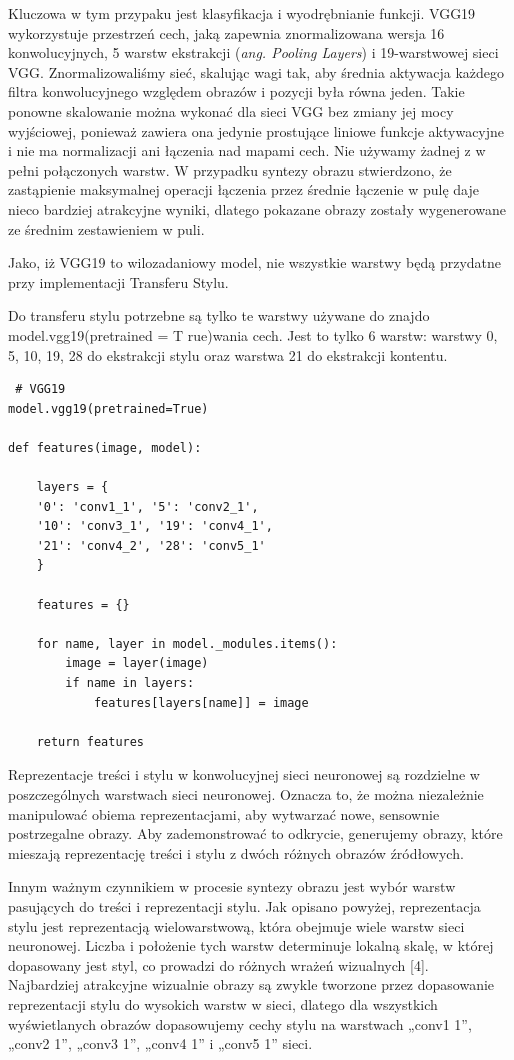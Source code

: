 \documentclass[brudnopis]{xmgr}
\begin{document}
Kluczowa w tym przypaku jest klasyfikacja i wyodrębnianie funkcji.
VGG19 wykorzystuje przestrzeń cech, jaką zapewnia znormalizowana wersja 16 konwolucyjnych, 5 warstw ekstrakcji (\textit{ang. Pooling Layers}) i 19-warstwowej sieci VGG. Znormalizowaliśmy sieć, skalując wagi tak, aby średnia aktywacja każdego filtra konwolucyjnego względem obrazów i pozycji była równa jeden. Takie ponowne skalowanie można wykonać dla sieci VGG bez zmiany jej mocy wyjściowej, ponieważ zawiera ona jedynie prostujące liniowe funkcje aktywacyjne i nie ma normalizacji ani łączenia nad mapami cech. Nie używamy żadnej z w pełni połączonych warstw. W przypadku syntezy obrazu stwierdzono, że zastąpienie maksymalnej operacji łączenia przez średnie łączenie w pulę daje nieco bardziej atrakcyjne wyniki, dlatego pokazane obrazy zostały wygenerowane ze średnim zestawieniem w puli. 

Jako, iż VGG19 to wilozadaniowy model, nie wszystkie warstwy będą przydatne przy implementacji Transferu Stylu. 

Do transferu stylu potrzebne są tylko te warstwy używane do znajdo
model.vgg19(pretrained = T rue)wania cech. Jest to tylko 6 warstw: warstwy 0, 5, 10, 19, 28 do ekstrakcji stylu oraz warstwa  21 do ekstrakcji kontentu.

\begin{lstlisting}
 # VGG19
model.vgg19(pretrained=True) 
 
def features(image, model):

	layers = {
	'0': 'conv1_1', '5': 'conv2_1', 
	'10': 'conv3_1', '19': 'conv4_1', 
	'21': 'conv4_2', '28': 'conv5_1'
	}

	features = {}

	for name, layer in model._modules.items():
		image = layer(image)
		if name in layers:
			features[layers[name]] = image

	return features
\end{lstlisting}


Reprezentacje treści i stylu w konwolucyjnej sieci neuronowej są rozdzielne w poszczególnych warstwach sieci neuronowej. Oznacza to, że można niezależnie manipulować obiema reprezentacjami, aby wytwarzać nowe, sensownie postrzegalne obrazy. Aby zademonstrować to odkrycie, generujemy obrazy, które mieszają reprezentację treści i stylu z dwóch różnych obrazów źródłowych.

Innym ważnym czynnikiem w procesie syntezy obrazu jest wybór warstw pasujących do treści i reprezentacji stylu. Jak opisano powyżej, reprezentacja stylu jest reprezentacją wielowarstwową, która obejmuje wiele warstw sieci neuronowej. Liczba i położenie tych warstw determinuje lokalną skalę, w której dopasowany jest styl, co prowadzi do różnych wrażeń wizualnych [4]. 
\\
 Najbardziej atrakcyjne wizualnie obrazy są zwykle tworzone przez dopasowanie reprezentacji stylu do wysokich warstw w sieci, dlatego dla wszystkich wyświetlanych obrazów dopasowujemy cechy stylu na warstwach „conv1 1”, „conv2 1”, „conv3 1”, „conv4 1” i „conv5 1” sieci.
\end{document}
